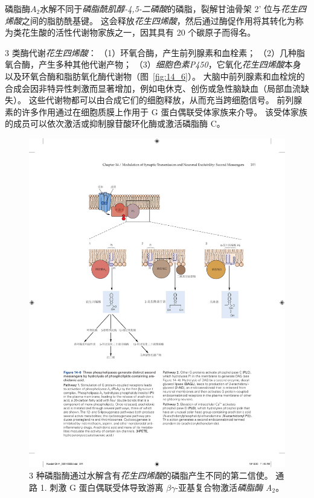 磷脂酶$A_2$水解不同于\textit{磷脂酰肌醇-4,5-二磷酸}的磷脂，裂解甘油骨架 2' 位与\textit{花生四烯酸}之间的脂肪酰基键。
这会释放\textit{花生四烯酸}，然后通过酶促作用将其转化为称为类花生酸的活性代谢物家族之一，因其具有 20 个碳原子而得名。


3 类酶代谢\textit{花生四烯酸}：
（1）环氧合酶，产生前列腺素和血栓素；
（2）几种脂氧合酶，产生多种其他代谢产物；
（3）\textit{细胞色素P450}，它氧化\textit{花生四烯酸}本身以及环氧合酶和脂肪氧化酶代谢物（图~\ref{fig:14_6}）。
大脑中前列腺素和血栓烷的合成会因非特异性刺激而显著增加，例如电休克、创伤或急性脑缺血（局部血流缺失）。
这些代谢物都可以由合成它们的细胞释放，从而充当跨细胞信号。
前列腺素的许多作用通过在细胞质膜上作用于 G 蛋白偶联受体家族来介导。
该受体家族的成员可以依次激活或抑制腺苷酸环化酶或激活磷脂酶 C。


\begin{figure}[htbp]
	\centering
	\includegraphics[width=1.0\linewidth]{chap14/fig_14_6}
	\caption{3 种磷脂酶通过水解含有\textit{花生四烯酸}的磷脂产生不同的第二信使。
		通路 1. 刺激 G 蛋白偶联受体导致游离 $\beta \gamma$-亚基复合物激活\textit{磷脂酶 A$_2$}。
}
\end{figure}
